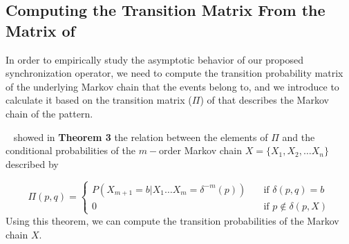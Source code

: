 






 
\subsection{Computing the Transition Matrix From the Matrix of \pmcmr }

\par In order to empirically study the asymptotic behavior of our proposed synchronization operator, we need to compute the transition probability matrix of the underlying Markov chain that the events belong to, and we introduce to calculate it  based on the transition matrix ($\Pi$) of \pmcmr that describes the Markov chain of the pattern.

~\citet{nuel_pattern_2008} showed in \textbf{Theorem 3} the relation between the elements  of 
$\Pi$ and the conditional probabilities of the $m-$order Markov chain $X=\{X_1, X_2, \ldots X_n\}$ described by 

\[ \Pi(p, q) =
\begin{cases}
P(X_{m+1}=b|X_1\ldots X_m=\delta^{-m}(p))       & \quad \text{if } \delta(p,q)=b \\
0  & \quad \text{if } p \notin  \delta(p,X)
\end{cases}
\]
Using this theorem, we can compute the transition probabilities of the Markov chain $X$.
